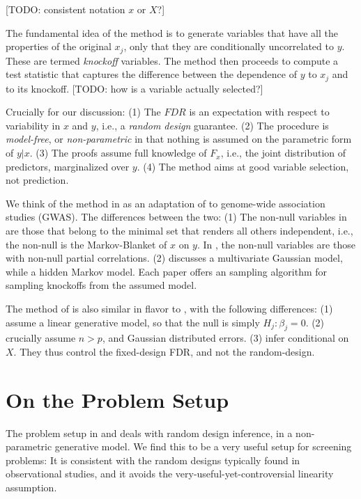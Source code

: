 \documentclass[article,lineno]{biometrika}
\begin{document}
[TODO: consistent notation $x$ or $X$?]

The fundamental idea of the method is to generate variables that have all the properties of the original $x_j$, only that they are conditionally uncorrelated to $y$.
These are termed \emph{knockoff} variables.
The method then proceeds to compute a test statistic that captures the difference between the dependence of $y$ to $x_j$ and to its knockoff.
[TODO: how is a variable actually selected?]

Crucially for our discussion:
(1) The $FDR$ is an expectation with respect to variability in $x$ and $y$, i.e., a \emph{random design} guarantee.
(2) The procedure is \emph{model-free}, or \emph{non-parametric} in that nothing is assumed on the parametric form of $y|x$.
(3) The proofs assume full knowledge of $F_x$, i.e., the joint distribution of predictors, marginalized over $y$.
(4) The method aims at good variable selection, not prediction.

We think of the method in \cite{SesiaGenehuntinghidden} as an adaptation of \cite{CandesPanninggoldmodelX2018} to genome-wide association studies (GWAS).
The differences between the two:
(1) The non-null variables in \cite{CandesPanninggoldmodelX2018} are those that belong to the minimal set that renders all others independent, i.e., the non-null is the Markov-Blanket of $x$ on $y$.
In \cite{SesiaGenehuntinghidden}, the non-null variables are those with non-null partial correlations.
(2) \cite{CandesPanninggoldmodelX2018} discusses a multivariate Gaussian model, while \cite{SesiaGenehuntinghidden} a hidden Markov model.
Each paper offers an sampling algorithm for sampling knockoffs from the assumed model.

The method of \cite{SesiaGenehuntinghidden} is also similar in flavor to \cite{BarberControllingfalsediscovery2015}, with the following differences:
(1) \cite{BarberControllingfalsediscovery2015} assume a linear generative model, so that the null is simply $H_j:\beta_j=0$.
(2) \cite{BarberControllingfalsediscovery2015} crucially assume $n>p$, and Gaussian distributed errors.
(3) \cite{BarberControllingfalsediscovery2015} infer conditional on $X$. They thus control the fixed-design FDR, and not the random-design.



\section{On the Problem Setup}

The problem setup in \cite{CandesPanninggoldmodelX2018} and \cite{SesiaGenehuntinghidden} deals with random design inference, in a non-parametric generative model.
We find this to be a very useful setup for screening problems:
It is consistent with the random designs typically found in observational studies, and it avoids the very-useful-yet-controversial linearity assumption.
\end{document}

